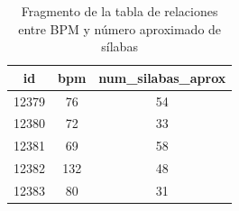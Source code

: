 \begin{itemize}
    \begin{table}[ht]
\centering
\begin{tabular}{|c|c|c|}
\hline
\textbf{id} & \textbf{bpm} & \textbf{num\_silabas\_aprox} \\
\hline
12379 & 76  & 54 \\
12380 & 72  & 33 \\
12381 & 69  & 58 \\
12382 & 132 & 48 \\
12383 & 80  & 31 \\
\hline
\end{tabular}
\caption{Fragmento de la tabla de relaciones entre BPM y número aproximado de sílabas}
\label{tab:bpm_silabas}
\end{table}
    

\end{itemize}

